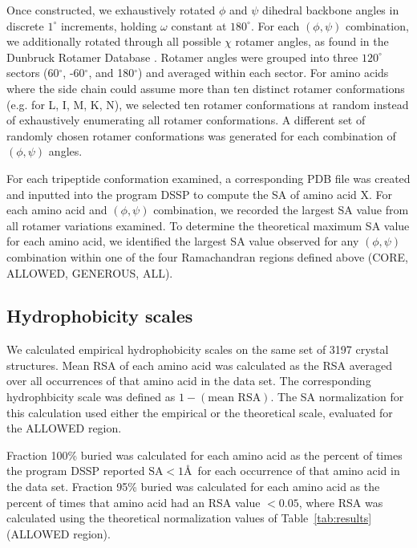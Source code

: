 \documentclass[11pt]{article}
\begin{document}
Once constructed, we exhaustively rotated $\phi$ and $\psi$ dihedral backbone angles in discrete $1^\circ$ increments, holding $\omega$ constant at $180^\circ$. For each $(\phi, \psi)$ combination, we additionally rotated through all possible $\chi$ rotamer angles, as found in the Dunbruck Rotamer Database \cite{WangDunbrack2003}. Rotamer angles were grouped into three $120^\circ$ sectors (60$^\circ$, -60$^\circ$, and 180$^\circ$) and averaged within each sector. For amino acids where the side chain could assume more than ten distinct rotamer conformations (e.g. for L, I, M, K, N), we selected ten rotamer conformations at random instead of exhaustively enumerating all rotamer conformations. A different set of randomly chosen rotamer conformations was generated for each combination of $(\phi, \psi)$ angles. 

For each tripeptide conformation examined, a corresponding PDB file was created and inputted into the program DSSP \cite{Kabsch1983} to compute the SA of amino acid X. For each amino acid and $(\phi, \psi)$ combination, we recorded the largest SA value from all rotamer variations examined. To determine the theoretical maximum SA value for each amino acid, we identified the largest SA value observed for any $(\phi, \psi)$ combination within one of the four Ramachandran regions defined above (CORE, ALLOWED, GENEROUS, ALL).

\subsection*{Hydrophobicity scales}

We calculated empirical hydrophobicity scales on the same set of 3197 crystal structures. Mean RSA of each amino acid was calculated as the RSA averaged over all occurrences of that amino acid in the data set. The corresponding hydrophbicity scale was defined as $1-(\text{mean RSA})$. The SA normalization for this calculation used either the empirical or the theoretical scale, evaluated for the ALLOWED region.

Fraction 100\% buried was calculated for each amino acid as the percent of times the program DSSP reported $\text{SA}<1$\AA\ for each occurrence of that amino acid in the data set. Fraction 95\% buried was calculated for each amino acid as the percent of times that amino acid had an RSA value $<0.05$, where RSA was calculated using the theoretical normalization values of Table~\ref{tab:results} (ALLOWED region).

\end{document}
